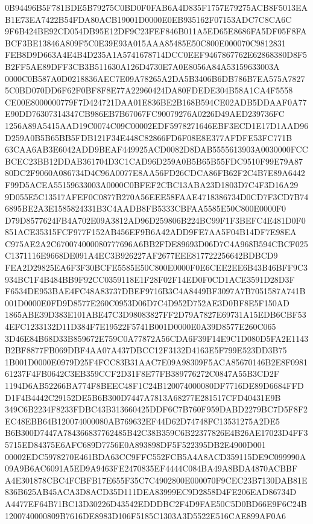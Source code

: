\documentclass[UTF8,fontset=fandol,zihao=-4,a4paper]{ctexart}
\begin{document}
{{0B94496B5F781BDE5B79275C0BD0F0FAB6A4D835F1757E79275ACB8F5013EAB1E73EA7422B54FDA80ACB19001D0000E0EB935162F07153ADC7C8CA6C
9F6B424BE92CD054DB95E12DF9C23FEF846B011A5ED65E8686FA5DF05F8FABCF3BE13846A809F5C0E39E93A015AAA85485E50C800E000070C9812831
FEB8D9D663A4E4B4D235A1A5741678714DCC0EEF9467867762E62868380D8F5B2FF5AE89DFF3CB3B511630A126D4730E7A0E8056A84A53159633003A
0000C0B587A0D0218836AEC7E09A78265A2DA5B3406B6DB786B7EA575A78275C0BD070DD6F62F0BF8F8E77A22960424DA80FDEDE304B58A1CA4F5558
CE00E8000000779F7D424721DAA01E836BE2B168B594CE02ADB5DDAAF0A77E90DD76307314347CB986EB7B67067FC90079276A0226D49AED239736FC
1256A89A5415AAD19C0074C09C00002EDF5978271646EBF3ECD1E17D1AAD96D259A0B5B65BB5FDB121F34E448C82866FD6F08E8E377AFDFE53FC771B
63CAA6AB3E6042ADD9BEAF449925ACD0082D8DAB5555613903A0030000FCCBCEC23BB12DDAB361704D3C1CAD96D259A0B5B65B55FDC9510F99E79A87
80DC2F9060A086734D4C96A0077E8AA56FD26CDCA86FB62F2C4B7E89A6442F99D5ACEA55159633003A0000C0BFEF2CBC13ABA23D1803D7C4F3D16A29
9D055E5C13517AFEF0C0877B270A56EEE58FAAE4718386734D0CD7F3CD7B746895BE2A3E1585824331B3C4AADB8FB5333CBFAA5585E50C800E0000F0
D79D8577624FB4A702E09A3812AD96D259806B224BC99F1F3BEFC4E481D0F0851ACE35315FCF977F152AB456EF9B6A42ADD9FE7AA5F04B14DF7E98EA
C975AE2A2C670074000080777696A6BB2FDE89693D06D7C4A968B594CBCF025C1371116E9668DE091A4EC3B926227AF2677EEE817722256642BDBCD9
FEA2D29825EA6F3F30BCFE5585E50C800E0000F0E6CEE2EE6B43B46BFF9C3934BC1F4B484BB9F92CC0359118E1F28F02F14ED0F0CD1ACE3591D28D3F
F6534DE953BAE4FC48A83737DBEF9716B3C4A8449BF3097A7B7051587A741B001D0000E0FD9D8577E260C0953D06D7C4D952D752AE3D0BF8E5F150AD
1865ABE39D383E101ABE47C3D98083827FF2D79A7827E69731A15EDB6CBF534EFC1233132D11D384F7E19522F5741B001D0000E0A39D8577E260C065
3D46E84B68D33B859672E759C0A77872A56CDA6F39F14E9C1D080D5FA2E1143B2BF8877FB069DBF4AA07A437DBCC12F3132D4163E5F799E523DD3B75
1B001D0000E0979D25F4FCC83B31AAC7E09A98309F5ACA85670146B2E8F098161237F4FB0642C3EB359CCF2D31F8E77FB389776272C0847A55B3CD2F
1194D6AB52266BA774F8BEEC48F1C24B120074000080DF7716DE89D6684FFDD1F4B4442C29152DE5B6B300D7447A7813A68277E281517CFD40431E9B
349C6B2234F8233FDBC43B313660425DDF6C7B760F959DABD2279BC7D5F8F2EC48EBB64B120074000080AB769632EF44D62D74748FC13531275A2DE5
B6B300D7447A784366837762485B42C38B359C6B22377826E4B26AE17023D4FF35715ED84375E6AFC689D7756E0A893898DF5F522395DB2E4900D001
00002EDC5978270E461BDA63CC9FFC552FCB5A4A8ACD359115DE9C099990A09A9B6AC6091A5ED9A9463FE2470835EF4444C084BA49A8BDA4870ACBBF
A4E301878CBC4FCBFB17E655F35C7C4902800E000070F9CEC23B7130DAB81E836B625AB45ACA3D8ACD35D111DEA83999EC9D2858D4FE206EAD86734D
A4477EF64B71BC13D30226D43542EDDDBC2F4D9FAE50C5D0BD66E9F6C24B1200740000809B7616DE8983D106F5185C1303A3D5522E516CAE899AF0A6
}}
\end{document}
